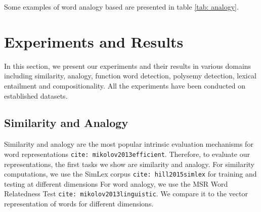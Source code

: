 \documentclass[11pt]{book}
\newcommand{\citep}[1]{\texttt{cite: #1}}
\begin{document}
Some examples of word analogy based are presented in table \ref{tab: analogy}. 
% 
% 

\section{Experiments and Results}
\label{sec: results}

In this section, we present our experiments and their results in various
domains including similarity, analogy, function word detection, polysemy
detection, lexical entailment and compositionality. All the experiments have
been conducted on established datasets.

\subsection{Similarity and Analogy}
\label{ssec: sim-anal}

Similarity and analogy are the most popular intrinsic evaluation mechanisms for
word representations \citep{mikolov2013efficient}. Therefore, to evaluate our
representations, the first tasks we show are similarity and analogy. For
similarity computations, we use the SimLex corpus \citep{hill2015simlex} for
training and testing at different dimensions For word analogy, we use the MSR
Word Relatedness Test \citep{mikolov2013linguistic}. We compare it to the
vector representation of words for different dimensions.
\end{document}
